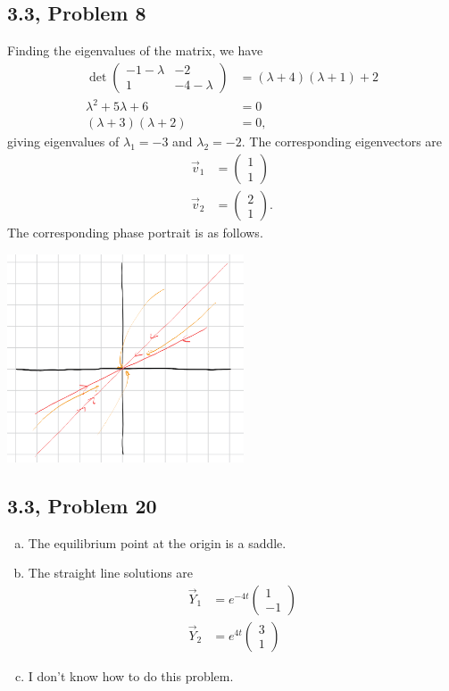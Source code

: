 \documentclass[10pt]{mypackage}
\begin{document}
\subsection{3.3, Problem 8}%
Finding the eigenvalues of the matrix, we have
\begin{align*}
  \det \begin{pmatrix}-1-\lambda & -2 \\ 1 & -4-\lambda\end{pmatrix} &= \left(\lambda + 4\right)\left(\lambda + 1\right) + 2\\
  \lambda^2 + 5\lambda + 6 &= 0\\
  \left(\lambda + 3\right)\left(\lambda + 2\right) &= 0,
\end{align*}
giving eigenvalues of $\lambda_1 = -3$ and $\lambda_2 = -2$. The corresponding eigenvectors are
\begin{align*}
  \vec{v}_1 &= \begin{pmatrix}1\\1\end{pmatrix}\\
  \vec{v}_2 &= \begin{pmatrix}2\\1\end{pmatrix}.
\end{align*}
The corresponding phase portrait is as follows.
\begin{center}
  \includegraphics[width=7cm]{images/3_3_8.png}
\end{center}
\subsection{3.3, Problem 20}%
\begin{enumerate}[(a)]
  \item The equilibrium point at the origin is a saddle.
  \item The straight line solutions are 
    \begin{align*}
      \vec{Y}_1 &= e^{-4t} \begin{pmatrix}1\\-1\end{pmatrix}\\
      \vec{Y}_2 &= e^{4t} \begin{pmatrix}3\\1\end{pmatrix}
    \end{align*}
  \item I don't know how to do this problem.
\end{enumerate}
\end{document}
